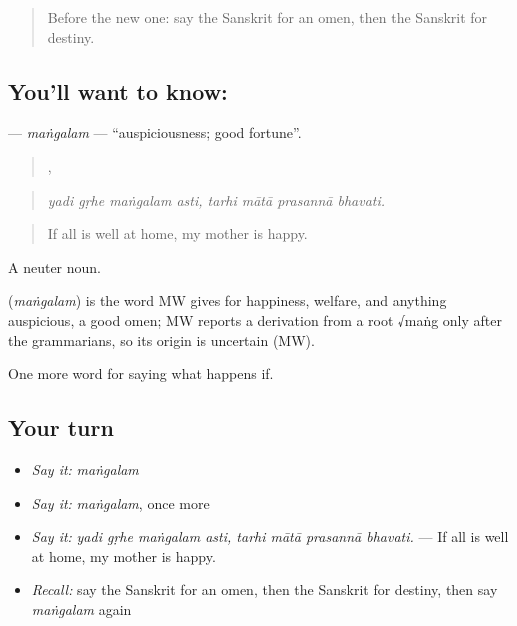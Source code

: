 \label{lesson:SA-C538-mangalam}



\begin{quote}
Before the new one: say the Sanskrit for an omen, then the Sanskrit for destiny.
\end{quote}

\subsection*{You'll want to know: }
\textbf{} — \emph{maṅgalam} — \textquotedblleft{}auspiciousness; good fortune\textquotedblright{}.

\begin{quote}
   ,    
\end{quote}

\begin{quote}
\emph{yadi gṛhe maṅgalam asti, tarhi mātā prasannā bhavati.}
\end{quote}

\begin{quote}
If all is well at home, my mother is happy.
\end{quote}

A neuter noun.

\begin{cousinweb}
\textbf{} (\emph{maṅgalam}) is the word MW gives for happiness, welfare, and anything auspicious, a good omen; MW reports a derivation from a root √maṅg only after the grammarians, so its origin is uncertain (MW).
\end{cousinweb}

\begin{grammarlens}[title={What you've built}]
One more word for saying what happens if.
\end{grammarlens}

\subsection*{Your turn}
\begin{itemize}
\raggedright
  \item \emph{Say it:} \emph{maṅgalam}
  \item \emph{Say it:} \emph{maṅgalam}, once more
  \item \emph{Say it:} \emph{yadi gṛhe maṅgalam asti, tarhi mātā prasannā bhavati.} — If all is well at home, my mother is happy.
  \item \emph{Recall:} say the Sanskrit for an omen, then the Sanskrit for destiny, then say \emph{maṅgalam} again
\end{itemize}

